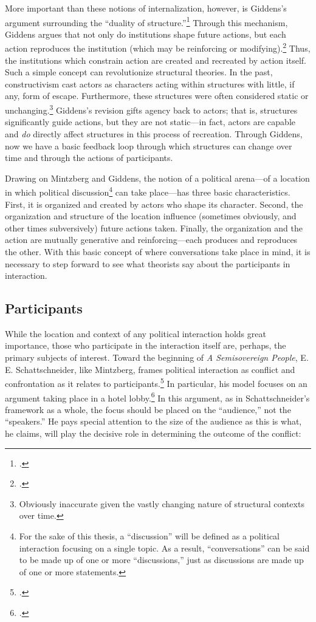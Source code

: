 \documentclass[openany,twoside]{memoir}
\begin{document}
\begin{Spacing}{2}
More important than these notions of internalization, however, is Giddens's argument surrounding the ``duality of structure.''\footcite[16]{giddens86}
Through this mechanism, Giddens argues that not only do institutions shape future actions, but each action reproduces the institution (which may be reinforcing or modifying).\footcite[19]{giddens86}
Thus, the institutions which constrain action are created and recreated by action itself.
Such a simple concept can revolutionize structural theories.
In the past, constructivism cast actors as characters acting within structures with little, if any, form of escape.
Furthermore, these structures were often considered static or unchanging.\footnote{
Obviously inaccurate given the vastly changing nature of structural contexts over time.}
Giddens's revision gifts agency back to actors; that is, structures significantly guide actions, but they are not static---in fact, actors are capable and \emph{do} directly affect structures in this process of recreation.
Through Giddens, now we have a basic feedback loop through which structures can change over time and through the actions of participants.

Drawing on Mintzberg and Giddens, the notion of a political arena---of a location in which political discussion\footnote{
For the sake of this thesis, a ``discussion'' will be defined as a political interaction focusing on a single topic.
As a result, ``conversations'' can be said to be made up of one or more ``discussions,'' just as discussions are made up of one or more statements.}
can take place---has three basic characteristics.
First, it is organized and created by actors who shape its character.
Second, the organization and structure of the location influence (sometimes obviously, and other times subversively) future actions taken.
Finally, the organization and the action are mutually generative and reinforcing---each produces and reproduces the other.
With this basic concept of where conversations take place in mind, it is necessary to step forward to see what theorists say about the participants in interaction.

\subsection{Participants}
While the location and context of any political interaction holds great importance, those who participate in the interaction itself are, perhaps, the primary subjects of interest. 
Toward the beginning of \emph{A Semisovereign People}, E. E. Schattschneider, like Mintzberg, frames political interaction as conflict and confrontation as it relates to participants.\footcite{schattschneider75} 
In particular, his model focuses on an argument taking place in a hotel lobby.\footcite[1--5. Ironically, despite mentioning the location of the conflict, Schattschneider fails to discuss how the location may have affected the interaction.]{schattschneider75} 
In this argument, as in Schattschneider's framework as a whole, the focus should be placed on the ``audience,'' not the ``speakers.'' 
He pays special attention to the size of the audience as this is what, he claims, will play the decisive role in determining the outcome of the conflict: 
\end{Spacing}
\end{document}
